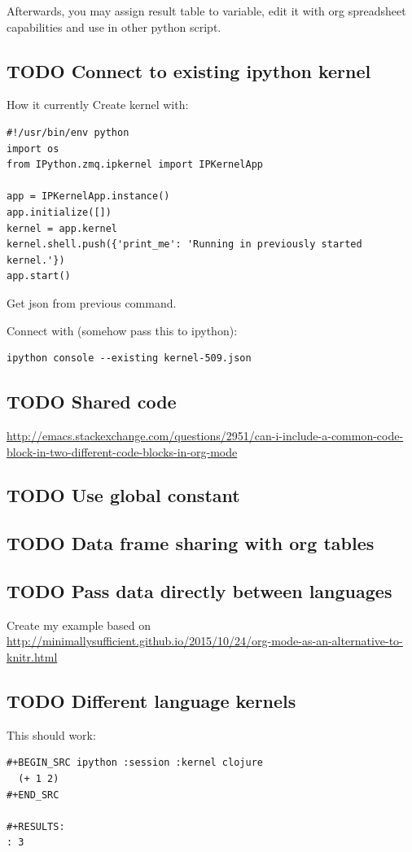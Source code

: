 \documentclass[11pt]{article}
\begin{document}
Afterwards, you may assign result table to variable, edit it with org spreadsheet capabilities and use in other python script.
\subsection{{\bfseries\sffamily TODO} Connect to existing ipython kernel}
\label{sec:orgheadline44}
How it currently 
Create kernel with:
\begin{verbatim}
#!/usr/bin/env python
import os
from IPython.zmq.ipkernel import IPKernelApp

app = IPKernelApp.instance()
app.initialize([])
kernel = app.kernel
kernel.shell.push({'print_me': 'Running in previously started kernel.'})
app.start()
\end{verbatim}

Get json from previous command.

Connect with (somehow pass this to ipython):
\begin{verbatim}
ipython console --existing kernel-509.json
\end{verbatim}

\subsection{{\bfseries\sffamily TODO} Shared code}
\label{sec:orgheadline45}
\url{http://emacs.stackexchange.com/questions/2951/can-i-include-a-common-code-block-in-two-different-code-blocks-in-org-mode}
\subsection{{\bfseries\sffamily TODO} Use global constant}
\label{sec:orgheadline46}

\subsection{{\bfseries\sffamily TODO} Data frame sharing with org tables}
\label{sec:orgheadline47}
\subsection{{\bfseries\sffamily TODO} Pass data directly between languages}
\label{sec:orgheadline10}
Create my example based on \url{http://minimallysufficient.github.io/2015/10/24/org-mode-as-an-alternative-to-knitr.html}
\subsection{{\bfseries\sffamily TODO} Different language kernels}
\label{sec:orgheadline48}
This should work:
\begin{verbatim}
#+BEGIN_SRC ipython :session :kernel clojure
  (+ 1 2)
#+END_SRC

#+RESULTS:
: 3
\end{verbatim}
\end{document}
